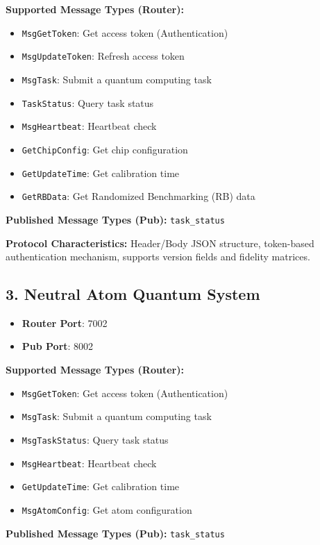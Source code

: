 \documentclass[UTF8, a4paper, 12pt]{article}
\begin{document}
\textbf{Supported Message Types (Router):}
\begin{itemize}
    \item \texttt{MsgGetToken}: Get access token (Authentication)
    \item \texttt{MsgUpdateToken}: Refresh access token
    \item \texttt{MsgTask}: Submit a quantum computing task
    \item \texttt{TaskStatus}: Query task status
    \item \texttt{MsgHeartbeat}: Heartbeat check
    \item \texttt{GetChipConfig}: Get chip configuration
    \item \texttt{GetUpdateTime}: Get calibration time
    \item \texttt{GetRBData}: Get Randomized Benchmarking (RB) data
\end{itemize}

\textbf{Published Message Types (Pub):} \texttt{task\_status}

\textbf{Protocol Characteristics:} Header/Body JSON structure, token-based authentication mechanism, supports version fields and fidelity matrices.

\subsection{3. Neutral Atom Quantum System}
\begin{itemize}
    \item \textbf{Router Port}: 7002
    \item \textbf{Pub Port}: 8002
\end{itemize}

\textbf{Supported Message Types (Router):}
\begin{itemize}
    \item \texttt{MsgGetToken}: Get access token (Authentication)
    \item \texttt{MsgTask}: Submit a quantum computing task
    \item \texttt{MsgTaskStatus}: Query task status
    \item \texttt{MsgHeartbeat}: Heartbeat check
    \item \texttt{GetUpdateTime}: Get calibration time
    \item \texttt{MsgAtomConfig}: Get atom configuration
\end{itemize}

\textbf{Published Message Types (Pub):} \texttt{task\_status}
\end{document}
